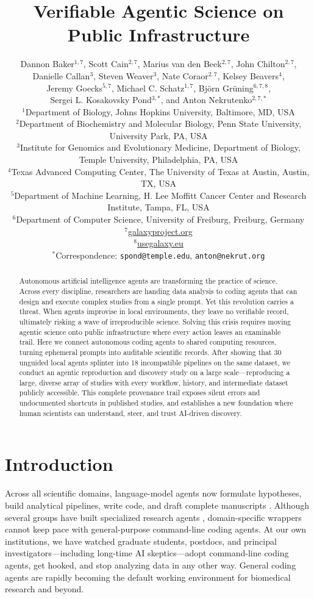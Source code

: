 \documentclass[11pt,letterpaper]{article}
\title{\textbf{Verifiable Agentic Science on Public Infrastructure}}
\author{%
  \parbox{\textwidth}{\centering
    Dannon Baker$^{1,7}$, Scott Cain$^{2,7}$, Marius van den Beek$^{2,7}$, John Chilton$^{2,7}$,\\
    Danielle Callan$^{3}$, Steven Weaver$^{3}$, Nate Coraor$^{2,7}$, Kelsey Beavers$^{4}$,\\
    Jeremy Goecks$^{5,7}$, Michael C. Schatz$^{1,7}$, Bj\"orn Gr\"uning$^{6,7,8}$,\\
    Sergei L. Kosakovsky Pond$^{3,*}$, and Anton Nekrutenko$^{2,7,*}$\\[0.8em]
    \small
    $^{1}$Department of Biology, Johns Hopkins University, Baltimore, MD, USA\\
    $^{2}$Department of Biochemistry and Molecular Biology, Penn State University, University Park, PA, USA\\
    $^{3}$Institute for Genomics and Evolutionary Medicine, Department of Biology,\\
    Temple University, Philadelphia, PA, USA\\
    $^{4}$Texas Advanced Computing Center, The University of Texas at Austin, Austin, TX, USA\\
    $^{5}$Department of Machine Learning, H. Lee Moffitt Cancer Center and Research Institute, Tampa, FL, USA\\
    $^{6}$Department of Computer Science, University of Freiburg, Freiburg, Germany\\
    $^{7}$\href{https://galaxyproject.org}{galaxyproject.org}\\
    $^{8}$\href{https://usegalaxy.eu}{usegalaxy.eu}\\[0.3em]
    $^{*}$Correspondence: \texttt{spond@temple.edu}, \texttt{anton@nekrut.org}
  }%
}
\date{}
\begin{document}
\maketitle

\begin{abstract}
Autonomous artificial intelligence agents are transforming the practice of science. Across every discipline, researchers are handing data analysis to coding agents that can design and execute complex studies from a single prompt. Yet this revolution carries a threat. When agents improvise in local environments, they leave no verifiable record, ultimately risking a wave of irreproducible science. Solving this crisis requires moving agentic science onto public infrastructure where every action leaves an examinable trail. Here we connect autonomous coding agents to shared computing resources, turning ephemeral prompts into auditable scientific records. After showing that 30 unguided local agents splinter into 18 incompatible pipelines on the same dataset, we conduct an agentic reproduction and discovery study on a large scale---reproducing a large, diverse array of studies with every workflow, history, and intermediate dataset publicly accessible. This complete provenance trail exposes silent errors and undocumented shortcuts in published studies, and establishes a new foundation where human scientists can understand, steer, and trust AI-driven discovery.
\end{abstract}

\section{Introduction}

Across all scientific domains, language-model agents now formulate hypotheses, build analytical pipelines, write code, and draft complete manuscripts \cite{boiko2023, chemcrow2024, virtuallab2025, aiscientist2024, kosmos2025, huang2025biomni}. Although several groups have built specialized research agents \cite{coscientist2026}, domain-specific wrappers cannot keep pace with general-purpose command-line coding agents. At our own institutions, we have watched graduate students, postdocs, and principal investigators---including long-time AI skeptics---adopt command-line coding agents, get hooked, and stop analyzing data in any other way. General coding agents are rapidly becoming the default working environment for biomedical research and beyond.
\end{document}
